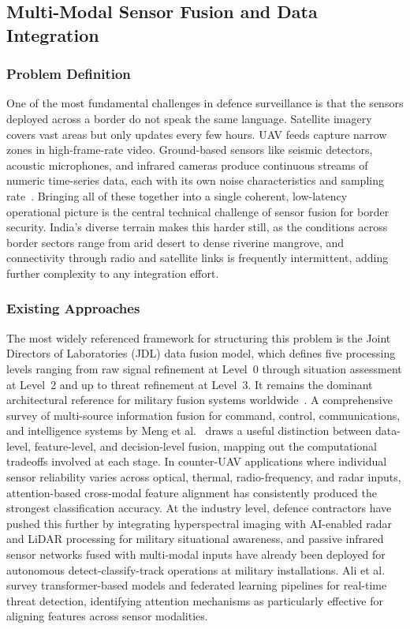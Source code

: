 \subsection{Multi-Modal Sensor Fusion and Data Integration}
\label{sec:fusion}

\subsubsection{Problem Definition}
One of the most fundamental challenges in defence surveillance is that the sensors deployed across a border do not speak the same language. Satellite imagery covers vast areas but only updates every few hours. UAV feeds capture narrow zones in high-frame-rate video. Ground-based sensors like seismic detectors, acoustic microphones, and infrared cameras produce continuous streams of numeric time-series data, each with its own noise characteristics and sampling rate~\cite{meng2023multisource}. Bringing all of these together into a single coherent, low-latency operational picture is the central technical challenge of sensor fusion for border security. India's diverse terrain makes this harder still, as the conditions across border sectors range from arid desert to dense riverine mangrove, and connectivity through radio and satellite links is frequently intermittent, adding further complexity to any integration effort.

\subsubsection{Existing Approaches}
The most widely referenced framework for structuring this problem is the Joint Directors of Laboratories (JDL) data fusion model, which defines five processing levels ranging from raw signal refinement at Level~0 through situation assessment at Level~2 and up to threat refinement at Level~3. It remains the dominant architectural reference for military fusion systems worldwide~\cite{meng2023multisource}. A comprehensive survey of multi-source information fusion for command, control, communications, and intelligence systems by Meng et al.~\cite{meng2023multisource} draws a useful distinction between data-level, feature-level, and decision-level fusion, mapping out the computational tradeoffs involved at each stage. In counter-UAV applications where individual sensor reliability varies across optical, thermal, radio-frequency, and radar inputs, attention-based cross-modal feature alignment has consistently produced the strongest classification accuracy. At the industry level, defence contractors have pushed this further by integrating hyperspectral imaging with AI-enabled radar and LiDAR processing for military situational awareness, and passive infrared sensor networks fused with multi-modal inputs have already been deployed for autonomous detect-classify-track operations at military installations. Ali et al.~\cite{threatdetect2024rt} survey transformer-based models and federated learning pipelines for real-time threat detection, identifying attention mechanisms as particularly effective for aligning features across sensor modalities.

